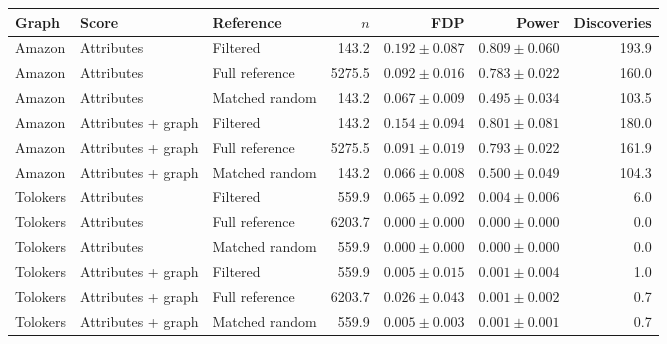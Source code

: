 \begin{tabular}{lllrrrr}
\toprule
Graph & Score & Reference & $n$ & FDP & Power & Discoveries \\
\midrule
Amazon & Attributes & Filtered & 143.2 & $0.192\pm0.087$ & $0.809\pm0.060$ & 193.9 \\
Amazon & Attributes & Full reference & 5275.5 & $0.092\pm0.016$ & $0.783\pm0.022$ & 160.0 \\
Amazon & Attributes & Matched random & 143.2 & $0.067\pm0.009$ & $0.495\pm0.034$ & 103.5 \\
Amazon & Attributes + graph & Filtered & 143.2 & $0.154\pm0.094$ & $0.801\pm0.081$ & 180.0 \\
Amazon & Attributes + graph & Full reference & 5275.5 & $0.091\pm0.019$ & $0.793\pm0.022$ & 161.9 \\
Amazon & Attributes + graph & Matched random & 143.2 & $0.066\pm0.008$ & $0.500\pm0.049$ & 104.3 \\
Tolokers & Attributes & Filtered & 559.9 & $0.065\pm0.092$ & $0.004\pm0.006$ & 6.0 \\
Tolokers & Attributes & Full reference & 6203.7 & $0.000\pm0.000$ & $0.000\pm0.000$ & 0.0 \\
Tolokers & Attributes & Matched random & 559.9 & $0.000\pm0.000$ & $0.000\pm0.000$ & 0.0 \\
Tolokers & Attributes + graph & Filtered & 559.9 & $0.005\pm0.015$ & $0.001\pm0.004$ & 1.0 \\
Tolokers & Attributes + graph & Full reference & 6203.7 & $0.026\pm0.043$ & $0.001\pm0.002$ & 0.7 \\
Tolokers & Attributes + graph & Matched random & 559.9 & $0.005\pm0.003$ & $0.001\pm0.001$ & 0.7 \\
\bottomrule
\end{tabular}
